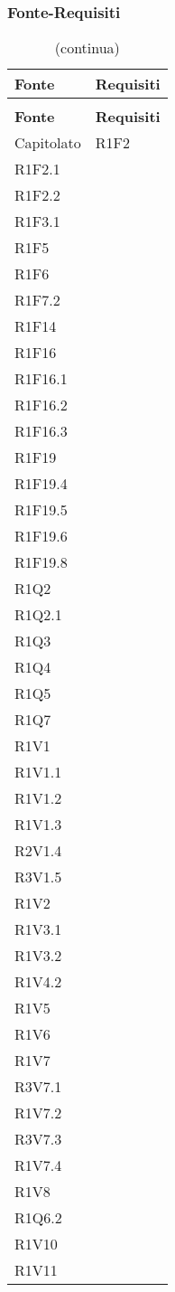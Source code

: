\subsubsection{Fonte-Requisiti}

	
	\begin{longtable}{ >{\centering\arraybackslash}m{}
			>{\centering}p{}}
		\caption{Tabella di tracciamento fonte-requisiti}\\
		\rowcolorhead 
		\textbf{\color{white}Fonte}
		& \textbf{\color{white}Requisiti} 
		\tabularnewline 	
		\endfirsthead
		\rowcolor{white}\caption[]{(continua)} \\
		\rowcolorhead 
		\textbf{\color{white}Fonte}
		& \textbf{\color{white}Requisiti} 
		\tabularnewline 
		\endhead
		
		
		Capitolato	&	R1F2\\
		R1F2.1\\
		R1F2.2\\
		R1F3.1\\
		R1F5\\
		R1F6\\
		R1F7.2\\
		R1F14\\
		R1F16\\
		R1F16.1\\
		R1F16.2\\
		R1F16.3\\
		R1F19\\
		R1F19.4\\
		R1F19.5\\
		R1F19.6\\
		R1F19.8\\
		R1Q2\\
		R1Q2.1\\
		R1Q3\\
		R1Q4\\
		R1Q5\\
		R1Q7\\
		R1V1\\
		R1V1.1\\
		R1V1.2\\
		R1V1.3\\
		R2V1.4\\
		R3V1.5\\
		R1V2\\
		R1V3.1\\
		R1V3.2\\
		R1V4.2\\
		R1V5\\
		R1V6\\
		R1V7\\
		R3V7.1\\
		R1V7.2\\
		R3V7.3\\
		R1V7.4\\
		R1V8\\
		R1Q6.2\\
		R1V10\\
		R1V11	\tabularnewline
		

\end{longtable}
